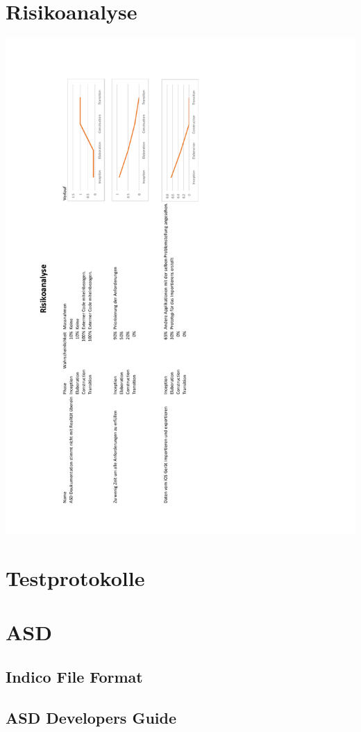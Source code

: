 \section{Risikoanalyse}
\includegraphics[scale= 0.75]{resources/RisikoAnalyse.pdf}
\section{Testprotokolle} \label{sec:testProtocolls}

\section{ASD} \label{sec:asd}
\subsection{Indico File Format}

\subsection{ASD Developers Guide} \label{subsection:developersGuide}
